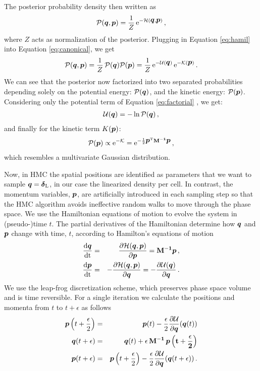 \documentclass[twocolumn]{aastex63}
\newcommand{\mbi}[1]{\hbox{\boldmath{$#1$}}}
\newcommand{\mat}[1]{\ensuremath{\rm\bf #1}}
\newcommand{\ba}{\begin{eqnarray}}
\newcommand{\ea}{\end{eqnarray}}
\begin{document}
\begin{CJK*}{UTF8}{gbsn}
The posterior probability density then written as
\ba
\label{eq:canonical}
\mathcal{P}(\mbi{q},\mbi{p})=\frac{1}{Z}\,{\rm e}^{-\mathcal{H}(\mbi{q},\mbi{p})}\,,
\ea
where $Z$ acts as normalization of the posterior. 
Plugging in Equation \ref{eq:hamil} into Equation \ref{eq:canonical}, we get
\ba
\label{eq:factorial}
\mathcal{P}(\mbi{q},\mbi{p})=\frac{1}{Z}\,\mathcal{P}(\mbi{q})\mathcal{P}(\mbi{p})=\frac{1}{Z}\,{\rm e}^{-\mathcal{U}(\mbi{q})}\,{\rm e}^{-\mathcal{K}(\mbi{p})}\,.
\ea
We can see that the posterior now factorized into two separated probabilities depending solely on the potential energy: $\mathcal{P}(\mbi{q})$, and the kinetic energy: $\mathcal{P}(\mbi{p})$. 
Considering only the potential term of Equation \ref{eq:factorial} , we get:
\ba
\label{eq:pos}
\mathcal{U}(\mbi{q})=-\ln \mathcal{P}(\mbi{q})\,,
\ea
and finally for the kinetic term $K(\mbi{p})$:
\ba
\mathcal{P}(\mbi{p})\propto {\rm e}^{-\mathcal{K}}={\rm e}^{-\frac{1}{2}\mbi{p}^{\rm T} \mat M^{-1}\mbi{p}}\,,
\ea
which resembles a multivariate Gaussian distribution.



Now, in HMC the spatial positions are identified as parameters that we want to sample  $\mbi q = \mbi \delta_{\rm L}$, in our case the linearized density per cell.
In contrast,  the momentum variables, $\mbi  p$, are artificially introduced in each sampling step so that the HMC algorithm avoids ineffective random walks to move through the phase space. 
We use the Hamiltonian equations of motion to evolve the system in (pseudo-)time $t$. 
The partial derivatives of the Hamiltonian determine how $\mbi{q}$ and $\mbi{p}$ change with time, $t$, according to Hamilton's equations of motion 
\ba
\label{eq:ham1}
\frac{\rm d \mbi q}{\rm d t} & = & \frac{\partial {\mathcal H}(\mbi{q},\mbi{p})}{\partial \mbi p}=   \mat{M}^{-1}\mbi p  \,,\\
\frac{\rm d \mbi p}{\rm d t} & = & -\frac{\partial {\mathcal H}(\mbi{q},\mbi{p})}{\partial \mbi q}= -\frac{\partial \mathcal{U}(\mbi{q})}{\partial \mbi q} \,.
\ea
We use the leap-frog discretization scheme, which preserves phase space volume and is time reversible. For a single iteration we calculate the positions and momenta from $t$ to  $t+\epsilon$ as follows
\ba
\mbi p\left(t+\frac{\epsilon}{2}\right)&=&\mbi p(t)-\frac{\epsilon}{2}\frac{\partial\mathcal{U}}{\partial\mbi q}(\mbi q(t))\\
\mbi q(t +\epsilon)&=&\mbi q(t)+\epsilon \,\mat M^{-1} \,\mbi p\left(t +\frac{\epsilon}{2}\right)\\
\mbi p(t +\epsilon)&=&\mbi p\left(t +\frac{\epsilon}{2}\right)-\frac{\epsilon}{2}\frac{\partial \mathcal{U}}{\partial \mbi q}(\mbi q(t +\epsilon))\,.
\ea


\end{CJK*}
\end{document}
